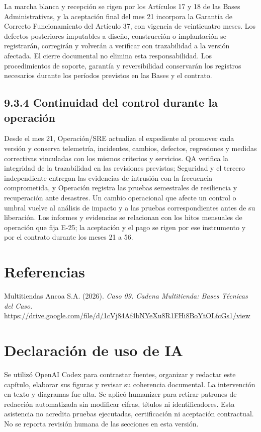 \documentclass[11pt]{article}
\begin{document}
La marcha blanca y recepción se rigen por los Artículos 17 y 18 de las Bases Administrativas, y la aceptación final del mes 21 incorpora la Garantía de Correcto Funcionamiento del Artículo 37, con vigencia de veinticuatro meses. Los defectos posteriores imputables a diseño, construcción o implantación se registrarán, corregirán y volverán a verificar con trazabilidad a la versión afectada. El cierre documental no elimina esta responsabilidad. Los procedimientos de soporte, garantía y reversibilidad conservarán los registros necesarios durante los períodos previstos en las Bases y el contrato.

\subsection{9.3.4 Continuidad del control durante la operación}

Desde el mes 21, Operación/SRE actualiza el expediente al promover cada versión y conserva telemetría, incidentes, cambios, defectos, regresiones y medidas correctivas vinculadas con los mismos criterios y servicios. QA verifica la integridad de la trazabilidad en las revisiones previstas; Seguridad y el tercero independiente entregan las evidencias de intrusión con la frecuencia comprometida, y Operación registra las pruebas semestrales de resiliencia y recuperación ante desastres. Un cambio operacional que afecte un control o umbral vuelve al análisis de impacto y a las pruebas correspondientes antes de su liberación. Los informes y evidencias se relacionan con los hitos mensuales de operación que fija E-25; la aceptación y el pago se rigen por ese instrumento y por el contrato durante los meses 21 a 56.

\section*{Referencias}

Multitiendas Ancoa S.A. (2026). \textit{Caso 09. Cadena Multitienda: Bases Técnicas del Caso}. \url{https://drive.google.com/file/d/1cVj84Af4bNYeXu8R1FHi8BoYtOLfcGs1/view}

\section*{Declaración de uso de IA}

Se utilizó OpenAI Codex para contrastar fuentes, organizar y redactar este capítulo, elaborar sus figuras y revisar su coherencia documental. La intervención en texto y diagramas fue alta. Se aplicó humanizer para retirar patrones de redacción automatizada sin modificar cifras, títulos ni identificadores. Esta asistencia no acredita pruebas ejecutadas, certificación ni aceptación contractual. No se reporta revisión humana de las secciones en esta versión.
\end{document}
